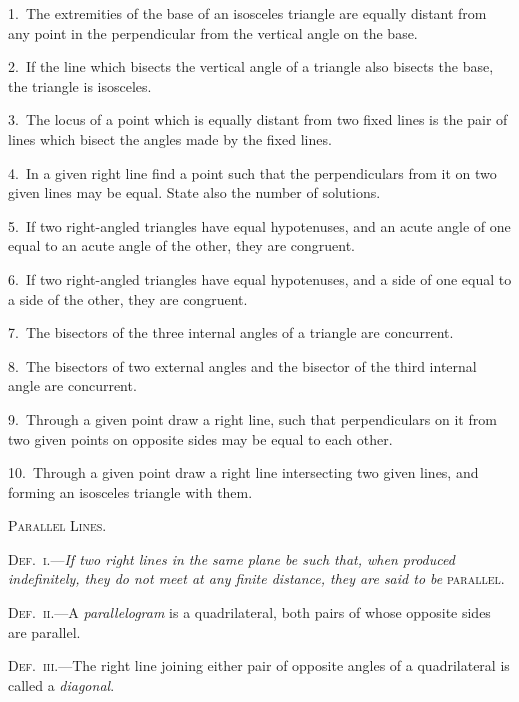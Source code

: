 \documentclass[oneside]{book}
\begin{document}
\begin{footnotesize}
1.~The extremities of the base of an isosceles triangle are equally
distant from any point in the perpendicular from the vertical angle
on the base.

2.~If the line which bisects the vertical angle of a triangle also
bisects the base, the triangle is isosceles.

3.~The locus of a point which is equally distant from two fixed
lines is the pair of lines which bisect the angles made by the
fixed lines.

4.~In a given right line find a point such that the perpendiculars
from it on two given lines may be equal. State also the number
of solutions.

5.~If two right-angled triangles have equal hypotenuses, and
an acute angle of one equal to an acute angle of the other, they
are congruent.

6.~If two right-angled triangles have equal hypotenuses, and
a side of one equal to a side of the other, they are congruent.

7.~The bisectors of the three internal angles of a triangle are
concurrent.

8.~The bisectors of two external angles and the bisector of the
third internal angle are concurrent.

9.~Through a given point draw a right line, such that perpendiculars
on it from two given points on opposite sides may be
equal to each other.

10.~Through a given point draw a right line intersecting two
given lines, and forming an isosceles triangle with them.
\par\end{footnotesize}

\begin{center}
\textsc{Parallel Lines.}
\end{center}

\textsc{Def.~i.}---\textit{If two right lines in the same plane be such
that, when produced indefinitely, they do not meet at any
finite distance, they are said to be} \textsc{parallel}.

\textsc{Def.~ii.}---A \emph{parallelogram} is a quadrilateral, both
pairs of whose opposite sides are parallel.


\textsc{Def.~iii}.---The right line joining either pair of opposite
angles of a quadrilateral is called a \emph{diagonal}.
\end{document}
